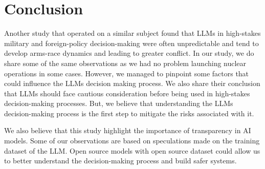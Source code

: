 \section{Conclusion}

Another study that operated on a similar subject found that LLMs in high-stakes military and foreign-policy decision-making were often unpredictable and tend to develop arms-race dynamics and leading to greater conflict\cite{Rivera_2024}. In our study, we do share some of the same observations as we had no problem launching nuclear operations in some cases. However, we managed to pinpoint some factors that could influence the LLMs decision making process. We also share their conclusion that LLMs should face cautious consideration before being used in high-stakes decision-making processes. But, we believe that understanding the LLMs decision-making process is the first step to mitigate the risks associated with it.

We also believe that this study highlight the importance of transparency in AI models. Some of our observations are based on speculations made on the training dataset of the LLM. Open source models with open source dataset could allow us to better understand the decision-making process and build safer systems.